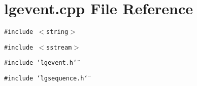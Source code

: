 \section{lgevent.cpp File Reference}
\label{lgevent_8cpp}
{\tt \#include $<$string$>$}\par
{\tt \#include $<$sstream$>$}\par
{\tt \#include \char`\"{}lgevent.h\char`\"{}}\par
{\tt \#include \char`\"{}lgsequence.h\char`\"{}}\par

